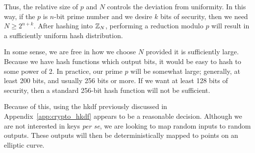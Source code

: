 \noindent
Thus, the relative size of $p$ and $N$ controls the deviation from uniformity.
In this way, if the $p$ is $n$-bit prime number and we desire
$k$ bits of security,
then we need $N\ge 2^{n+k}$.
After hashing into $\mathbb{Z}_{N}$, performing a reduction modulo $p$
will result in a sufficiently uniform hash distribution.

In some sense, we are free in how we choose $N$ provided it is
sufficiently large.
Because we have \glspl{hash function} which output bits,
it would be easy to hash to some power of 2.
In practice, our prime $p$ will be somewhat large;
generally, at least 200 bits, and usually 256 bits or more.
If we want at least 128 bits of security, then a standard 256-bit
\gls{hash function} will not be sufficient.

Because of this, using the \gls{hkdf} previously discussed in
Appendix~\ref{app:crypto_hkdf} appears to be a reasonable decision.
Although we are not interested in keys \emph{per se},
we are looking to map random inputs
to random outputs.
These outputs will then be deterministically mapped to points
on an \gls{elliptic curve}.
